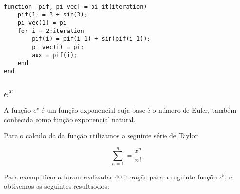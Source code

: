 \begin{lstlisting}

function [pif, pi_vec] = pi_it(iteration)
	pif(1) = 3 + sin(3);
	pi_vec(1) = pi
	for i = 2:iteration
		pif(i) = pif(i-1) + sin(pif(i-1));
		pi_vec(i) = pi;
		aux = pif(i);
	end
end

\end{lstlisting}

\subsection{$e^x$}

	A função $e^x$ é um função exponencial cuja base é o número de Euler,
	também conhecida como função exponencial natural.

	Para o calculo da da função utilizamos a seguinte série de Taylor
	
	\begin{equation}
		\sum_{n=1}^{n} = \frac{x^n}{n!}
	\end{equation}

	Para exemplificar a foram realizadas 40 iteração para a seguinte função $e^5$, e obtivemos os seguintes resultaodos:

